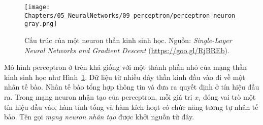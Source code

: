 \begin{figure}[t]
 \centering
     \texttt{[image: Chapters/05\_NeuralNetworks/09\_perceptron/perceptron\_neuron\_gray.png]}
     \caption{ 
    Cấu trúc của một neuron thần kinh sinh học. Nguồn: \textit{Single-Layer Neural Networks and Gradient Descent} (\url{https://goo.gl/RjBREb}).
    }
     \label{fig:9_per_nn}
 \end{figure} 




    


 
Mô hình perceptron ở trên khá giống với một thành phần nhỏ của mạng thần kinh
sinh học như Hình~\ref{fig:9_per_nn}. Dữ liệu từ nhiều dây thần kinh đầu vào đi
về một nhân tế bào. Nhân tế bào tổng hợp thông tin và đưa ra quyết định ở tín
hiệu đầu ra. Trong mạng neuron nhận tạo của perceptron, mỗi giá trị $x_i$ đóng
vai trò một tín hiệu đầu vào, hàm tính tổng và hàm kích hoạt có chức năng tương
tự nhân tế bào. Tên gọi \textit{mạng neuron nhân tạo} được khởi nguồn từ đây.

